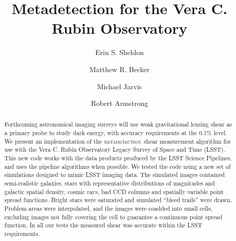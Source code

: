 \documentclass[twocolumn,twocolappendix,astrosym]{openjournal}
\newcommand{\dm}{LSST Science Pipelines}
\newcommand{\mdet}{\textsc{metadetection}}
\newcommand{\Mcal}{\textsc{Metacalibration}}
\newcommand{\Mdet}{\textsc{Metadetection}}
\begin{document}



\title{Metadetection for the Vera C. Rubin Observatory}

\author{Erin S. Sheldon}
\author{Matthew R. Becker}
\author{Michael Jarvis}
\author{Robert Armstrong}


\begin{abstract}

        Forthcoming astronomical imaging surveys will use weak gravitational
        lensing shear as a primary probe to study dark energy, with accuracy
        requirements at the 0.1\% level.  We present an implementation of the
        \mdet\ shear measurement algorithm for use with the Vera C. Rubin
        Observatory Legacy Survey of Space and Time (LSST).  This new code
        works with the data products produced by the \dm, and uses the pipeline
        algorithms when possible.  We tested the code using a new set of
        simulations designed to mimic LSST imaging data.  The simulated images
        contained semi-realistic galaxies, stars with representative
        distributions of magnitudes and galactic spatial density, cosmic rays,
        bad CCD columns and spatially variable point spread functions.  Bright
        stars were saturated and simulated ``bleed trails'' were drawn.
        Problem areas were interpolated, and the images were coadded into small
        cells, excluding images not fully covering the cell to guarantee a
        continuous point spread function.  In all our tests the measured shear
        was accurate within the LSST requirements.



\end{abstract}
\end{document}
